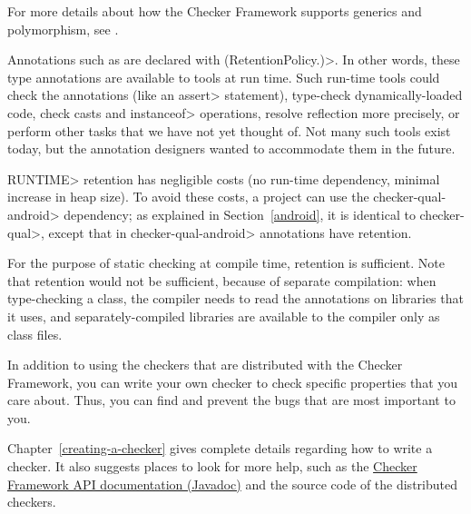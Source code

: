 For more details about how the Checker Framework supports generics and
polymorphism, see .



Annotations such as  are
declared with
\<(RetentionPolicy.)>.  In other words,
these type annotations are available to tools at run time.  Such run-time
tools could check the annotations (like an \<assert> statement), type-check
dynamically-loaded code, check casts and \<instanceof> operations, resolve
reflection more precisely, or perform other tasks that we have not yet thought of.
Not many such tools exist today, but the annotation designers wanted to
accommodate them in the future.

\<RUNTIME> retention has negligible costs (no run-time dependency, minimal
increase in heap size). To avoid these costs, a project can use the
\<checker-qual-android> dependency; as explained in Section~\ref{android},
it is identical to \<checker-qual>, except that in \<checker-qual-android>
annotations have
retention.

For the purpose of static checking at compile time,
retention is sufficient.  Note that
retention would not be sufficient, because of separate compilation: when
type-checking a class, the compiler needs to read the annotations on
libraries that it uses, and separately-compiled libraries are available to
the compiler only as class files.




In addition to using the checkers that are distributed with the Checker
Framework, you can write your own checker to check specific properties that
you care about.  Thus, you can find and prevent the bugs that are most
important to you.

Chapter~\ref{creating-a-checker} gives
complete details regarding how to write a checker.  It also suggests places
to look for more help, such as the \href{../api/}{Checker Framework
API documentation (Javadoc)} and the source code of the distributed
checkers.


